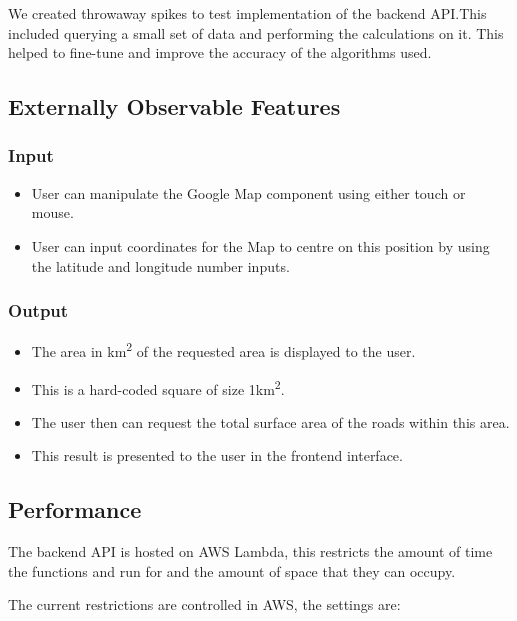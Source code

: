 \documentclass[a4paper,11pt]{article}
\begin{document}
We created throwaway spikes to test implementation of the backend API.\@ This
included querying a small set of data and performing the calculations on it.
This helped to fine-tune and improve the accuracy of the algorithms used.

\subsection{Externally Observable Features}


\subsubsection{Input}

\begin{itemize}
  \item User can manipulate the Google Map component using either touch or
    mouse.
  \item User can input coordinates for the Map to centre on this position by
    using the latitude and longitude number inputs.
\end{itemize}

\subsubsection{Output}

\begin{itemize}
  \item The area in km\textsuperscript{2} of the requested area is displayed to
    the user.
  \item This is a hard-coded square of size 1km\textsuperscript{2}.
  \item The user then can request the total surface area of the roads within
    this area.
  \item This result is presented to the user in the frontend interface.
\end{itemize}

\subsection{Performance}

The backend API is hosted on AWS Lambda, this restricts the amount of time the
functions and run for and the amount of space that they can occupy.

The current restrictions are controlled in AWS, the settings are:
\end{document}
